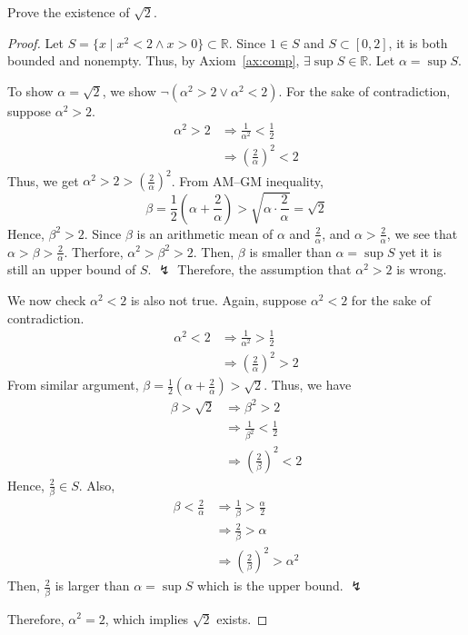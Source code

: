 \documentclass[../main.tex]{subfiles}
\begin{document}
\begin{ex} \label{ex:exists_sq2}
    Prove the existence of $\sqrt 2$.
\end{ex}
\begin{proof}
    Let $S = \{ x \mid x^2 < 2 \wedge x > 0\} \subset \mathbb{R}$.
    Since $1 \in S$ and $S \subset [0, 2]$, it is both bounded and nonempty.
    Thus, by Axiom~\ref{ax:comp}, $\exists \sup S \in \mathbb{R}$.
    Let $\alpha = \sup S$.

    To show $\alpha = \sqrt 2$, we show $\neg (\alpha^2 > 2 \vee \alpha^2 <2)$.
    For the sake of contradiction, suppose $\alpha^2 > 2$.
    \begin{align*}
        \alpha^2 > 2 &\Rightarrow \frac{1}{\alpha^2} < \frac 1 2\\
                     &\Rightarrow \left( \frac{2}{\alpha}\right)^2 < 2
    \end{align*}
    Thus, we get $\alpha^2 > 2 > \left(\frac 2 \alpha\right)^2$.
    From AM--GM inequality,
    \[
        \beta = \frac 1 2 \left(\alpha + \frac 2 \alpha\right) > \sqrt{\alpha \cdot \frac 2 \alpha} = \sqrt 2
    \]
    Hence, $\beta^2 > 2$.
    Since $\beta$ is an arithmetic mean of $\alpha$ and $\frac 2 \alpha$, and $\alpha > \frac 2 \alpha$, we see that $\alpha > \beta > \frac 2 \alpha$.
    Therfore, $\alpha^2 > \beta^2 > 2$.
    Then, $\beta$ is smaller than $\alpha = \sup S$ yet it is still an upper bound of $S$. $\lightning$
    Therefore, the assumption that $\alpha^2 > 2$ is wrong.

    We now check $\alpha^2 < 2$ is also not true.
    Again, suppose $\alpha^2 < 2$ for the sake of contradiction.
    \begin{align*}
        \alpha^2 < 2 &\Rightarrow \frac{1}{\alpha^2} > \frac 1 2\\
                     &\Rightarrow \left(\frac 2 \alpha\right)^2 > 2
    \end{align*}
    From similar argument, $\beta = \frac 1 2 \left(\alpha + \frac 2 \alpha\right) > \sqrt 2$.
    Thus, we have
    \begin{align*}
        \beta > \sqrt 2 &\Rightarrow \beta^2 > 2\\
                        &\Rightarrow \frac{1}{\beta^2} < \frac 1 2\\
                        &\Rightarrow \left(\frac{2}{\beta}\right)^2 < 2
    \end{align*}
    Hence, $\frac 2 \beta \in S$.
    Also, 
    \begin{align*}
        \beta < \frac 2 \alpha &\Rightarrow \frac 1 \beta > \frac \alpha 2\\
                               &\Rightarrow \frac 2 \beta > \alpha\\
                               &\Rightarrow \left(\frac 2 \beta\right)^2 > \alpha^2
    \end{align*}
    Then, $\frac 2 \beta$ is larger than $\alpha = \sup S$ which is the upper bound. $\lightning$

    Therefore, $\alpha^2 = 2$, which implies $\sqrt 2$ exists.
\end{proof}
\end{document}
